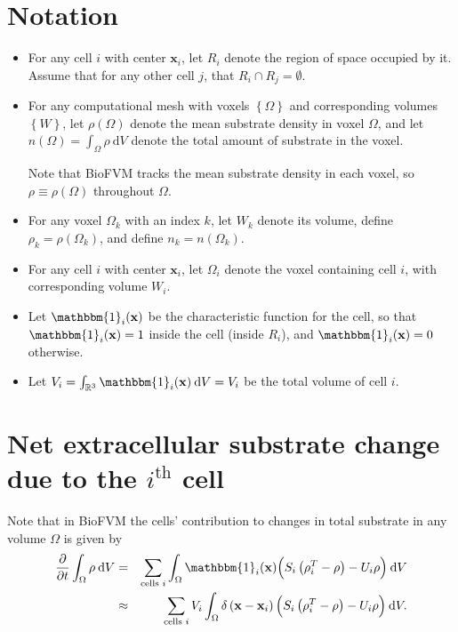 \documentclass[11point]{article}
\newcommand{\beq}{\begin{eqnarray}}
\newcommand{\eeq}{\end{eqnarray}}
\renewcommand{\d}[1]{\:\mathrm{d}#1}
\renewcommand{\vec}[1]{\mathbf{#1}}
\newcommand{\one}{\mathbbm{1}}
\newcommand{\reals}{\mathbb{R}}
\newcommand{\df}[1]{\delta \left( #1 \right)}
\newcommand{\set}[1]{\left\{#1\right\}}
\begin{document}
\section{Notation}
\begin{itemize}
\item
For any cell $i$ with center $\vec{x}_i$, let $R_i$ denote the 
region of space occupied by it. Assume that for any other cell 
$j$, that $R_i \cap R_j = \emptyset$. 
\item 
For any  computational 
mesh with voxels $\set{ \Omega }$ and corresponding 
volumes $\set{W}$, let $\rho( \Omega) $ denote the mean 
substrate density in voxel $\Omega$, and let 
$n(\Omega) = \int_\Omega \rho \d{V}$ denote the total
 amount of substrate in the voxel. 

Note that BioFVM tracks the mean substrate density in each voxel, 
so $\rho \equiv \rho( \Omega )$ throughout $\Omega$. 
\item 
For any voxel $\Omega_k$ with an index $k$, let $W_k$ denote 
its volume, define $\rho_k = \rho( \Omega_k )$, and 
define $n_k = n( \Omega_k)$. 

\item 
For any cell $i$ with center $\vec{x}_i$, let $\Omega_i$ denote the 
voxel containing cell $i$, with corresponding volume $W_i$. 
\item
Let $\one_i(\vec{x})$ be the characteristic  function for the cell, so that 
$\one_i(\vec{x}) =1$ inside the cell (inside $R_i$), and 
$\one_i(\vec{x}) = 0$ otherwise. 
\item 
Let $V_i = \int_{\reals^3} \one_i(\vec{x}) \d{V} = V_i$ be the total volume of cell $i$. 

\end{itemize}

\section{Net extracellular substrate change 
due to the $i^\textrm{th}$ cell}
Note that in BioFVM the cells' contribution 
to changes in total substrate in any volume $\Omega$ is given by 
\beq
\frac{ \partial }{ \partial t} 
\int_\Omega \rho \d{V} & = &  
\sum_{\textrm{cells } i} 
\int_\Omega  \one_i(\vec{x})
\Bigl(  S_i \left( \rho^T_i - \rho \right)  - U_i \rho   \Bigr) \d{V}\\
& \approx & 
\sum_{\textrm{cells } i}
V_i \int_\Omega \df{ \vec{x} - \vec{x}_i }
\Bigl(  S_i \left( \rho^T_i - \rho \right)  - U_i \rho   \Bigr) \d{V}.
\eeq 
\end{document}
